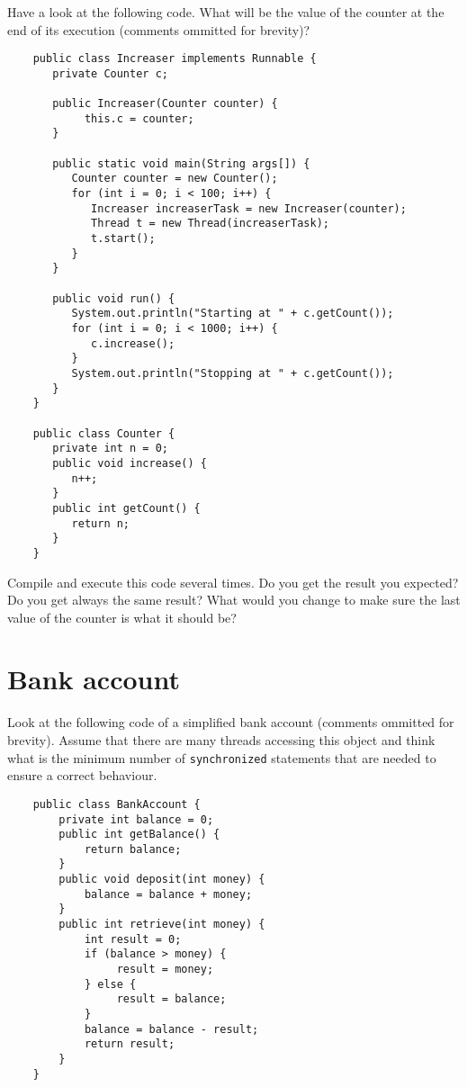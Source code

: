 \documentclass{article}
\begin{document}
Have a look at the following code. What will be the value of the
counter at the end of its execution (comments ommitted for brevity)? 

\begin{verbatim}
    public class Increaser implements Runnable {
       private Counter c;
    
       public Increaser(Counter counter) {
            this.c = counter;
       }
    
       public static void main(String args[]) {
          Counter counter = new Counter();
          for (int i = 0; i < 100; i++) {
             Increaser increaserTask = new Increaser(counter);
             Thread t = new Thread(increaserTask);
             t.start();
          }
       }
    
       public void run() {
          System.out.println("Starting at " + c.getCount());
          for (int i = 0; i < 1000; i++) {
             c.increase();
          }
          System.out.println("Stopping at " + c.getCount());
       }
    }

    public class Counter {
       private int n = 0;
       public void increase() {
          n++;
       }
       public int getCount() {
          return n;
       }
    }
\end{verbatim}

Compile and execute this code several times. Do you get the result you
expected? Do you get always the same result? What would you change to make
sure the last value of the counter is what it should be?

\section{Bank account}
\label{sec:bank-account}

Look at the following code of a simplified bank account (comments
ommitted for brevity). Assume that
there are many threads accessing this object and think what is the
minimum number of \verb+synchronized+ statements that are needed to
ensure a correct behaviour. 

\begin{verbatim}
    public class BankAccount {
        private int balance = 0;
        public int getBalance() {
            return balance;
        }
        public void deposit(int money) {
            balance = balance + money;
        }
        public int retrieve(int money) {
            int result = 0;
            if (balance > money) {
                 result = money;
            } else {
                 result = balance;
            }
            balance = balance - result;
            return result;
        }
    }
\end{verbatim}
\end{document}
